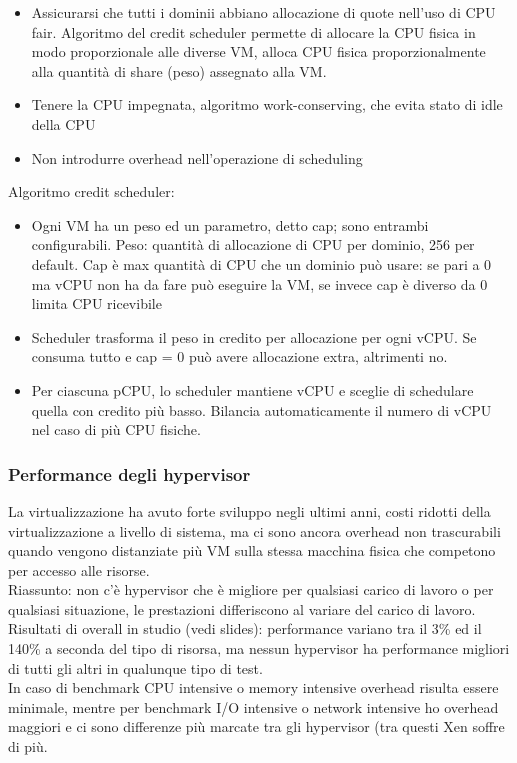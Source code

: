 \documentclass{article}
\begin{document}
\begin{itemize}
\item Assicurarsi che tutti i dominii abbiano allocazione di quote nell'uso di CPU fair. Algoritmo del credit scheduler permette di allocare la CPU fisica in modo proporzionale alle diverse VM, alloca CPU fisica proporzionalmente alla quantità di share (peso) assegnato alla VM.
\item Tenere la CPU impegnata, algoritmo work-conserving, che evita stato di idle della CPU
\item Non introdurre overhead nell'operazione di scheduling
\end{itemize}
Algoritmo credit scheduler:
\begin{itemize}
\item Ogni VM ha un peso ed un parametro, detto cap; sono entrambi configurabili. Peso: quantità di allocazione di CPU per dominio, 256 per default. Cap è max quantità di CPU che un dominio può usare: se pari a 0 ma vCPU non ha da fare può eseguire la VM, se invece cap è diverso da 0 limita CPU ricevibile
\item Scheduler trasforma il peso in credito per allocazione per ogni vCPU. Se consuma tutto e cap = 0 può avere allocazione extra, altrimenti no.
\item Per ciascuna pCPU, lo scheduler mantiene vCPU e sceglie di schedulare quella con credito più basso. Bilancia automaticamente il numero di vCPU nel caso di più CPU fisiche.
\end{itemize}
\subsubsection{Performance degli hypervisor}
La virtualizzazione ha avuto forte sviluppo negli ultimi anni, costi ridotti della virtualizzazione a livello di sistema, ma ci sono ancora overhead non trascurabili quando vengono distanziate più VM sulla stessa macchina fisica che competono per accesso alle risorse.\\ Riassunto: non c'è hypervisor che è migliore per qualsiasi carico di lavoro o per qualsiasi situazione, le prestazioni differiscono al variare del carico di lavoro.\\ Risultati di overall in studio (vedi slides): performance variano tra il 3\% ed il 140\% a seconda del tipo di risorsa, ma nessun hypervisor ha performance migliori di tutti gli altri in qualunque tipo di test.\\ In caso di benchmark CPU intensive o memory intensive overhead risulta essere minimale, mentre per benchmark I/O intensive o network intensive ho overhead maggiori e ci sono differenze più marcate tra gli hypervisor (tra questi Xen soffre di più.
\end{document}
